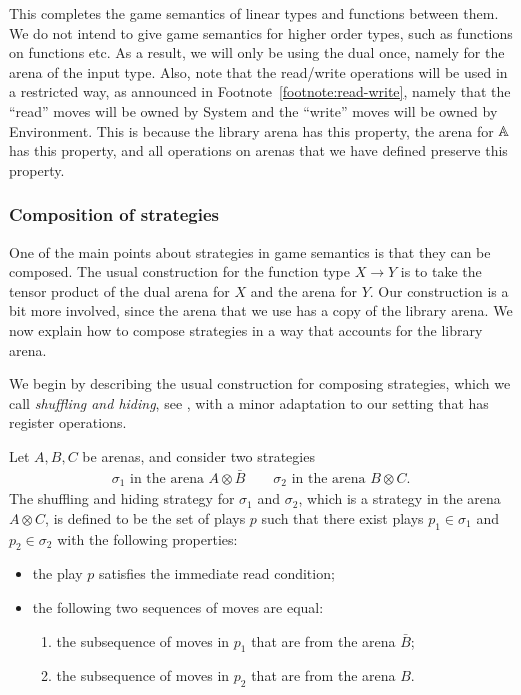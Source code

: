 This completes the game semantics of linear types and functions between them. We do not intend to give game semantics for higher order types, such as functions on functions etc. As a result, we will only be using the dual once, namely for the arena of the input type. Also, note that the read/write operations will be used in a restricted way, as announced in Footnote~\ref{footnote:read-write}, namely that the ``read'' moves will be owned by System and the ``write'' moves will be owned by Environment.  This is because the library arena has this property, the arena for $\mathbb A$ has this property, and all operations on arenas that we have defined preserve this property.

\subsubsection{Composition of strategies}
\label{sec:composition-of-strategies}
One of the main points about strategies in game semantics is that they can be composed.
The usual construction for the function type $X \to Y$ is to take the tensor product of the dual arena for $X$ and the arena for $Y$. 
Our construction is a bit more involved, since the arena that we use has a copy of the library arena. We now explain how to compose strategies in a way that accounts for the library arena. 

We begin by describing the usual construction for composing strategies, which we call \emph{shuffling and hiding}, see \cite[p.12]{abramsky2013semantics}, with a minor adaptation to our setting that has register operations. 

\begin{definition}\label{def:shuffling-and-hiding}
    Let $A, B, C$ be arenas, and consider two strategies
    \begin{align*}
    \sigma_1 \text{ in the arena $A \otimes \bar B$}
    \qquad
    \sigma_2 \text{ in the arena $B \otimes C$}.
    \end{align*}
    The shuffling and hiding strategy for  $\sigma_1$ and $\sigma_2$, which is a strategy  in the  arena $A \otimes C$, is defined to be the set of plays    $p$  such that there exist plays $p_1 \in \sigma_1$ and  $p_2 \in \sigma_2$  with the following properties: 
\begin{itemize}
    \item the play $p$ satisfies the immediate read condition;
    \item the following two sequences of moves are equal: 
    \begin{enumerate}
        \item the subsequence of moves in $p_1$ that are from the arena $\bar B$;
        \item the subsequence of moves in $p_2$ that are from the arena $B$.
    \end{enumerate}
\end{itemize}
\end{definition}


